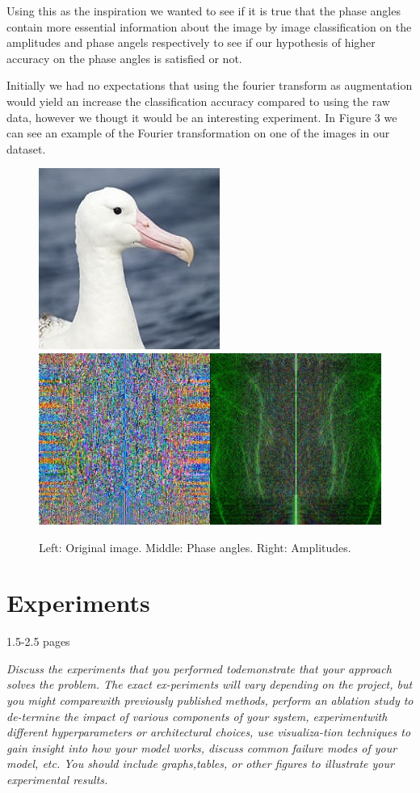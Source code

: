 \documentclass{article}
\begin{document}
Using this as the inspiration we wanted to see if it is true that the phase angles contain more essential information about the image by image classification on the amplitudes 
and phase angels respectively to see if our hypothesis of higher accuracy on the phase angles is satisfied or not. 

Initially we had no expectations that using the fourier transform as augmentation would yield an increase the classification accuracy compared to using 
the raw data, however we thougt it would be an interesting experiment. 
In Figure 3 we can see an example of the Fourier transformation on one of the images in our dataset. 

\begin{figure}[!htb]
	\raggedleft
	\includegraphics[scale=0.30]{fourier1}
	\endminipage
	\raggedleft
	\includegraphics[trim=0cm 0cm 0cm 0cm, scale=0.30]{fourier2}
	\endminipage
	\caption{Left: Original image. Middle: Phase angles. Right: Amplitudes.}
\end{figure}


\section{Experiments}

1.5-2.5 pages

\textit{Discuss the experiments that you performed todemonstrate  that  your  approach  solves  the  problem.   The  exact  ex-periments will vary depending on the project, but you might comparewith previously published methods, perform an ablation study to de-termine the impact of various components of your system, experimentwith different hyperparameters or architectural choices, use visualiza-tion  techniques  to  gain  insight  into  how  your  model  works,  discuss common failure modes of your model, etc.  You should include graphs,tables, or other figures to illustrate your experimental results.}
\end{document}
